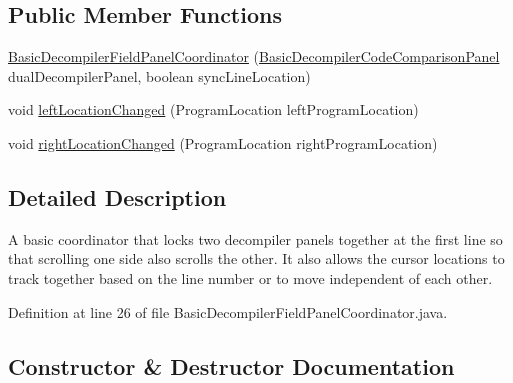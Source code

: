 \subsection*{Public Member Functions}
\begin{DoxyCompactItemize}
\item 
\mbox{\hyperlink{classghidra_1_1app_1_1decompiler_1_1component_1_1_basic_decompiler_field_panel_coordinator_a2764c8c272893858f249414c9cc0938e}{Basic\+Decompiler\+Field\+Panel\+Coordinator}} (\mbox{\hyperlink{classghidra_1_1app_1_1decompiler_1_1component_1_1_basic_decompiler_code_comparison_panel}{Basic\+Decompiler\+Code\+Comparison\+Panel}} dual\+Decompiler\+Panel, boolean sync\+Line\+Location)
\item 
void \mbox{\hyperlink{classghidra_1_1app_1_1decompiler_1_1component_1_1_basic_decompiler_field_panel_coordinator_ae1809e04fb7067bf6734d34129071183}{left\+Location\+Changed}} (Program\+Location left\+Program\+Location)
\item 
void \mbox{\hyperlink{classghidra_1_1app_1_1decompiler_1_1component_1_1_basic_decompiler_field_panel_coordinator_a6db30490ab0fa6ececbfa6e079677b9c}{right\+Location\+Changed}} (Program\+Location right\+Program\+Location)
\end{DoxyCompactItemize}


\subsection{Detailed Description}
A basic coordinator that locks two decompiler panels together at the first line so that scrolling one side also scrolls the other. It also allows the cursor locations to track together based on the line number or to move independent of each other. 

Definition at line 26 of file Basic\+Decompiler\+Field\+Panel\+Coordinator.\+java.



\subsection{Constructor \& Destructor Documentation}
\mbox{\label{classghidra_1_1app_1_1decompiler_1_1component_1_1_basic_decompiler_field_panel_coordinator_a2764c8c272893858f249414c9cc0938e}} 
